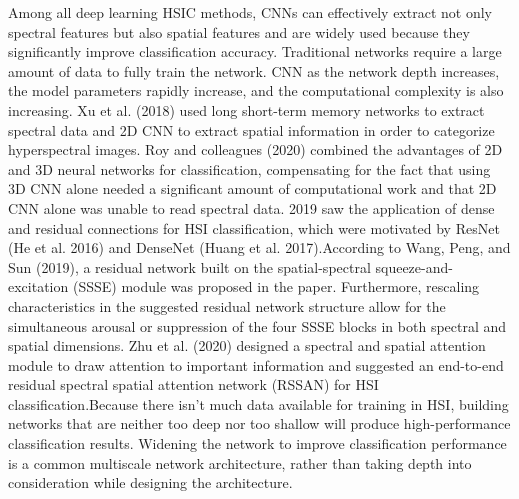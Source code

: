 \documentclass[]{interact}
\theoremstyle{plain}%
\theoremstyle{definition}
\theoremstyle{remark}
\begin{document}
Among all deep learning HSIC methods, CNNs can effectively extract not only spectral features but also spatial features and are widely used because they significantly improve classification accuracy. Traditional networks require a large amount of data to fully train the network. CNN as the network depth increases, the model parameters rapidly increase, and the computational complexity is also increasing. Xu et al. (2018) used long short-term memory networks to extract spectral data and 2D CNN to extract spatial information in order to categorize hyperspectral images. Roy and colleagues (2020) combined the advantages of 2D and 3D neural networks for classification, compensating for the fact that using 3D CNN alone needed a significant amount of computational work and that 2D CNN alone was unable to read spectral data. 2019 saw the application of dense and residual connections for HSI classification, which were motivated by ResNet (He et al. 2016) and DenseNet (Huang et al. 2017).According to Wang, Peng, and Sun (2019), a residual network built on the spatial-spectral squeeze-and-excitation (SSSE) module was proposed in the paper. Furthermore, rescaling characteristics in the suggested residual network structure allow for the simultaneous arousal or suppression of the four SSSE blocks in both spectral and spatial dimensions. Zhu et al. (2020) designed a spectral and spatial attention module to draw attention to important information and suggested an end-to-end residual spectral spatial attention network (RSSAN) for HSI classification.Because there isn't much data available for training in HSI, building networks that are neither too deep nor too shallow will produce high-performance classification results. Widening the network to improve classification performance is a common multiscale network architecture, rather than taking depth into consideration while designing the architecture.
\end{document}
